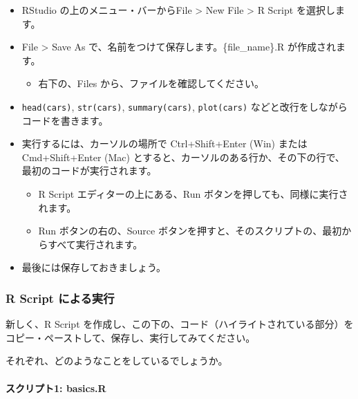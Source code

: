 \documentclass[
]{bxjsbook}
\providecommand{\tightlist}{%
  \setlength{\itemsep}{0pt}\setlength{\parskip}{0pt}}
\theoremstyle{definition}
\theoremstyle{definition}
\theoremstyle{definition}
\theoremstyle{definition}
\theoremstyle{remark}
\begin{document}
\begin{itemize}
\tightlist
\item
  RStudio の上のメニュー・バーからFile \textgreater{} New File \textgreater{} R Script を選択します。
\item
  File \textgreater{} Save As で、名前をつけて保存します。\{file\_name\}.R が作成されます。

  \begin{itemize}
  \tightlist
  \item
    右下の、Files から、ファイルを確認してください。
  \end{itemize}
\item
  \texttt{head(cars)}, \texttt{str(cars)}, \texttt{summary(cars)}, \texttt{plot(cars)} などと改行をしながらコードを書きます。
\item
  実行するには、カーソルの場所で Ctrl+Shift+Enter (Win) または Cmd+Shift+Enter (Mac) とすると、カーソルのある行か、その下の行で、最初のコードが実行されます。

  \begin{itemize}
  \tightlist
  \item
    R Script エディターの上にある、Run ボタンを押しても、同様に実行されます。
  \item
    Run ボタンの右の、Source ボタンを押すと、そのスクリプトの、最初からすべて実行されます。
  \end{itemize}
\item
  最後には保存しておきましょう。
\end{itemize}

\hypertarget{r-script-ux306bux3088ux308bux5b9fux884c}{%
\subsubsection{R Script による実行}\label{r-script-ux306bux3088ux308bux5b9fux884c}}

新しく、R Script を作成し、この下の、コード（ハイライトされている部分）をコピー・ペーストして、保存し、実行してみてください。

それぞれ、どのようなことをしているでしょうか。

\hypertarget{ux30b9ux30afux30eaux30d7ux30c81-basics.r}{%
\paragraph{スクリプト1: basics.R}\label{ux30b9ux30afux30eaux30d7ux30c81-basics.r}}
\end{document}
